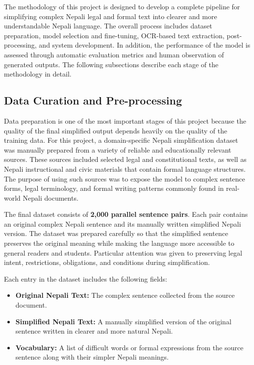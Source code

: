 \documentclass[12pt]{report}
\begin{document}

The methodology of this project is designed to develop a complete pipeline for simplifying complex Nepali legal and formal text into clearer and more understandable Nepali language. The overall process includes dataset preparation, model selection and fine-tuning, OCR-based text extraction, post-processing, and system development. In addition, the performance of the model is assessed through automatic evaluation metrics and human observation of generated outputs. The following subsections describe each stage of the methodology in detail.

\subsection{Data Curation and Pre-processing}

Data preparation is one of the most important stages of this project because the quality of the final simplified output depends heavily on the quality of the training data. For this project, a domain-specific Nepali simplification dataset was manually prepared from a variety of reliable and educationally relevant sources. These sources included selected legal and constitutional texts, as well as Nepali instructional and civic materials that contain formal language structures. The purpose of using such sources was to expose the model to complex sentence forms, legal terminology, and formal writing patterns commonly found in real-world Nepali documents.

The final dataset consists of \textbf{2,000 parallel sentence pairs}. Each pair contains an original complex Nepali sentence and its manually written simplified Nepali version. The dataset was prepared carefully so that the simplified sentence preserves the original meaning while making the language more accessible to general readers and students. Particular attention was given to preserving legal intent, restrictions, obligations, and conditions during simplification.

Each entry in the dataset includes the following fields:

\begin{itemize}
    \item \textbf{Original Nepali Text:} The complex sentence collected from the source document.
    \item \textbf{Simplified Nepali Text:} A manually simplified version of the original sentence written in clearer and more natural Nepali.
    \item \textbf{Vocabulary:} A list of difficult words or formal expressions from the source sentence along with their simpler Nepali meanings.
\end{itemize}
\end{document}
